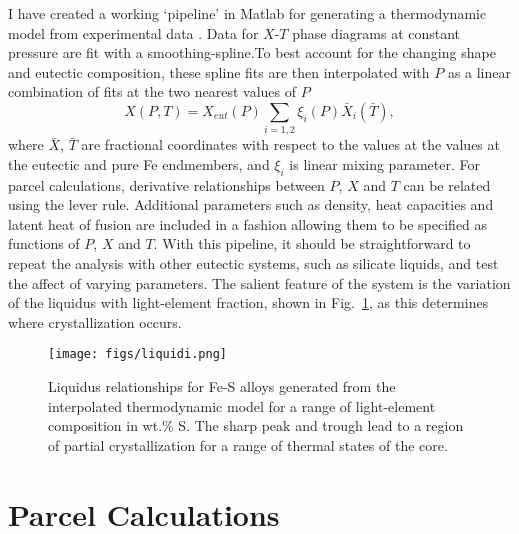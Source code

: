 I have created a working `pipeline' in Matlab for generating a thermodynamic model from
experimental data \cite{brett69,fei97,chen08,stewart07}. Data for 
$X$-$T$ phase diagrams at constant
pressure are fit with a smoothing-spline.To best account for the changing
shape and eutectic composition, these spline fits are then
interpolated with $P$ as a linear combination of fits at the two nearest
values of $P$
\begin{equation}
  X(P,T) = X_{eut}(P)\sum_{i=1,2}\xi_i(P)\bar{X}_i(\bar{T}),
\end{equation}
where $\bar{X}$, $\bar{T}$ are fractional coordinates with respect to the
values at the values at the eutectic and pure Fe endmembers, and $\xi_i$
is linear mixing parameter. For parcel
calculations, derivative relationships between $P$, $X$ and $T$ can be related
using the lever rule. Additional parameters such as density, heat capacities
and latent heat of fusion are included in a fashion allowing them to be
specified as functions of $P$, $X$ and $T$. With this pipeline, it should be
straightforward to repeat the analysis with other eutectic systems, such as
silicate liquids, and test the affect of varying parameters.
The salient feature of the system is the variation of the
liquidus with light-element fraction, shown in Fig.~\ref{fig:liquidi}, as this
determines where crystallization occurs.

 \begin{figure}[H] %
   \centering
   \texttt{[image: figs/liquidi.png]} 
   \caption{Liquidus relationships for Fe-S alloys generated from the interpolated thermodynamic 
   model for a range of light-element composition in wt.\% S. The sharp peak and trough lead to 
   a region of partial crystallization for a range of thermal states of the core.}
   \label{fig:liquidi}
\end{figure}

\section{Parcel Calculations}


